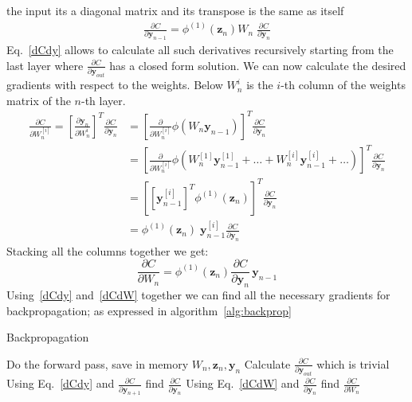 \documentclass[11pt]{report}
\begin{document}
    the input its a diagonal matrix and its transpose is the same as itself
    \begin{align}
        \frac{ \partial C}{\partial \textbf{y}_{n-1} }
        =
        \phi^{(1)}( \pmb{z}_n )
        W_n \;
        \frac{ \partial C}{\partial \textbf{y}_{n} }
        \label{dCdy}
    \end{align}
    Eq.~\eqref{dCdy} allows to calculate all such derivatives recursively starting from the last layer where $\frac{\partial C}{\partial \textbf{y}_{out}}$ has a closed form solution.
    We can now calculate the desired gradients with respect to the weights.
    Below $W_n^i$ is the $i$-th column of the weights matrix of the $n$-th layer.
    \begin{align*}
        \frac{ \partial C}{\partial W_n^{[i]} }
        =
        \left[ \frac{ \partial \pmb{y}_{n}}{\partial W_n^i } \right]^T
        \frac{ \partial C}{\partial \pmb{y}_{n} }
        &=
        \left[ \frac{ \partial }{\partial W_n^{[i]} }  \phi( W_{n} \bm{y}_{n-1} )  \right]^T
        \frac{ \partial C}{\partial \pmb{y}_{n} }
        \\
        &=
        \left[ \frac{ \partial }{\partial W_n^{[i]} }  \phi(  W_{n}^{[1]} \bm{y}_{n-1}^{[1]} + \dots +W_{n}^{[i]} \bm{y}_{n-1}^{[i]} + \dots )  \right]^T
        \frac{ \partial C}{\partial \pmb{y}_{n} }
        \\
        &=
        \left[ \left[ \pmb{y}_{n-1}^{[i]} \right]^T \phi^{(1)}(\pmb{z}_n )  \right]^T
        \frac{ \partial C}{\partial \pmb{y}_{n} }
        \\
        &=
        \phi^{(1)}(\pmb{z}_n ) \; \pmb{y}_{n-1}^{[i]}
        \frac{ \partial C}{\partial \pmb{y}_{n} }
    \end{align*}
    Stacking all the columns together we get:
    \begin{equation}
        \label{dCdW}
        \frac{ \partial C}{\partial W_n}
        =
        \phi^{(1)}(\pmb{z}_n )
        \frac{ \partial C}{\partial \pmb{y}_{n} }  \,
        \pmb{y}_{n-1}
    \end{equation}
    Using~\eqref{dCdy} and~\eqref{dCdW} together we can find all the necessary gradients for backpropagation; as expressed in algorithm~\ref{alg:backprop}
    \begin{algorithm}
        \caption{Backpropagation}
        \label{alg:backprop}
        \begin{algorithmic}
            \State Do the forward pass, save in memory $W_n, \textbf{z}_n, \textbf{y}_n$
            \State Calculate $\frac{\partial C}{\partial \textbf{y}_{out}}$ which is trivial
                \State Using Eq.~\eqref{dCdy} and  $\frac{\partial C}{\partial \textbf{y}_{n+1}} $ find $\frac{\partial C}{\partial \textbf{y}_n}$
                \State  Using Eq.~\eqref{dCdW} and $\frac{\partial C}{\partial \textbf{y}_n}$ find $\frac{\partial C}{\partial W_n}$
            \EndFor
        \end{algorithmic}
    \end{algorithm}
\end{document}
